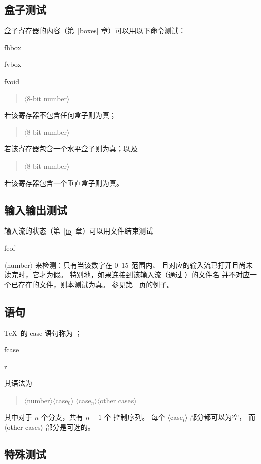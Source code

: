 \documentclass[a4paper]{rapport3}
\makeatletter
\def\gr#1{$\langle$#1$\rangle$}\def\key#1{{\tt#1}}
\newenvironment{disp}{\begin{quotation}}{\end{quotation}}
\def\cstoidx#1\par{\index{#1@\cs{#1}}}
\makeatother
\begin{document}
\subsection{盒子测试}

盒子寄存器的内容（第~\ref{boxes} 章）可以用以下命令测试：
\cstoidx ifhbox\par\cstoidx ifvbox\par\cstoidx ifvoid\par
\begin{disp}\gr{8-bit number}\end{disp}
若该寄存器不包含任何盒子则为真；
\begin{disp}\gr{8-bit number}\end{disp}
若该寄存器包含一个水平盒子则为真；以及
\begin{disp}\gr{8-bit number}\end{disp}
若该寄存器包含一个垂直盒子则为真。

\subsection{输入输出测试}

输入流的状态（第~\ref{io} 章）可以用文件结束测试
\cstoidx ifeof\par
{}\gr{number} 来检测：只有当该数字在 0--15 范围内、
且对应的输入流已打开且尚未读完时，它才为假。
特别地，如果连接到该输入流（通过 ）的文件名
并不对应一个已存在的文件，则本测试为真。
参见第~\pageref{ex:eof} 页的例子。

\subsection{ 语句}

\TeX\ 的 case 语句称为 ；
\cstoidx ifcase\par\cstoidx or\par
其语法为\begin{disp}\gr{number}\gr{case$_0$}%
\gr{case$_n$}\gr{other cases}
\end{disp} 其中对于 $n$ 个分支，共有 $n-1$ 个  控制序列。
每个 \gr{case$_i$} 部分都可以为空，
而 \gr{other cases} 部分是可选的。

\subsection{特殊测试}
\end{document}
